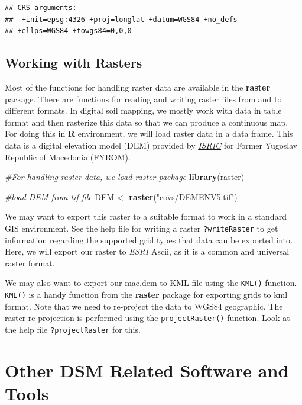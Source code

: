 \documentclass[10pt,b5paper,]{book}
\newenvironment{Shaded}{\begin{snugshade}}{\end{snugshade}}
\newcommand{\CommentTok}[1]{\textcolor[rgb]{0.56,0.35,0.01}{\textit{#1}}}
\newcommand{\KeywordTok}[1]{\textcolor[rgb]{0.13,0.29,0.53}{\textbf{#1}}}
\newcommand{\NormalTok}[1]{#1}
\newcommand{\StringTok}[1]{\textcolor[rgb]{0.31,0.60,0.02}{#1}}
\theoremstyle{definition}
\theoremstyle{definition}
\theoremstyle{definition}
\theoremstyle{remark}
\begin{document}
\begin{verbatim}
## CRS arguments:
##  +init=epsg:4326 +proj=longlat +datum=WGS84 +no_defs
## +ellps=WGS84 +towgs84=0,0,0
\end{verbatim}

\hypertarget{working-with-rasters}{%
\subsection{Working with Rasters}\label{working-with-rasters}}

Most of the functions for handling raster data are available in the
\textbf{raster} package. There are functions for reading and writing
raster files from and to different formats. In digital soil mapping, we
mostly work with data in table format and then rasterize this data so
that we can produce a continuous map. For doing this in \textbf{R}
environment, we will load raster data in a data frame. This data is a
digital elevation model (DEM) provided by
\href{http://www.isric.org/}{\emph{ISRIC}} for Former Yugoslav Republic
of Macedonia (FYROM).

\begin{Shaded}
\begin{Highlighting}[]
\CommentTok{#For handling raster data, we load raster package}
\KeywordTok{library}\NormalTok{(raster)}

\CommentTok{#load DEM from tif file}
\NormalTok{DEM <-}\StringTok{ }\KeywordTok{raster}\NormalTok{(}\StringTok{"covs/DEMENV5.tif"}\NormalTok{)}
\end{Highlighting}
\end{Shaded}

We may want to export this raster to a suitable format to work in a
standard GIS environment. See the help file for writing a raster
\texttt{?writeRaster} to get information regarding the supported grid
types that data can be exported into. Here, we will export our raster to
\emph{ESRI} Ascii, as it is a common and universal raster format.

We may also want to export our mac.dem to KML file using the
\texttt{KML()} function. \texttt{KML()} is a handy function from the
\textbf{raster} package for exporting grids to kml format. Note that we
need to re-project the data to WGS84 geographic. The raster
re-projection is performed using the \texttt{projectRaster()} function.
Look at the help file \texttt{?projectRaster} for this.

\hypertarget{other-dsm-related-software-and-tools}{%
\section{Other DSM Related Software and
Tools}\label{other-dsm-related-software-and-tools}}
\end{document}
